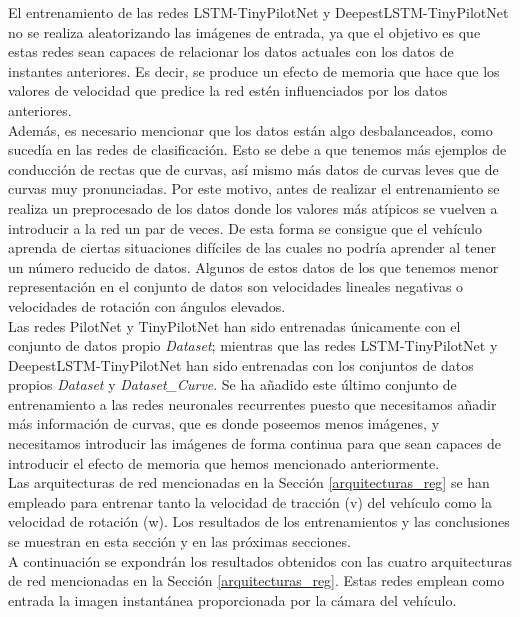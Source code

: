 El entrenamiento de las redes LSTM-TinyPilotNet y DeepestLSTM-TinyPilotNet no se realiza aleatorizando las imágenes de entrada, ya que el objetivo es que estas redes sean capaces de relacionar los datos actuales con los datos de instantes anteriores. Es decir, se produce un efecto de memoria que hace que los valores de velocidad que predice la red estén influenciados por los datos anteriores.\\

Además, es necesario mencionar que los datos están algo desbalanceados, como sucedía en las redes de clasificación. Esto se debe a que tenemos más ejemplos de conducción de rectas que de curvas, así mismo más datos de curvas leves que de curvas muy pronunciadas. Por este motivo, antes de realizar el entrenamiento se realiza un preprocesado de los datos donde los valores más atípicos se vuelven a introducir a la red un par de veces. De esta forma se consigue que el vehículo aprenda de ciertas situaciones difíciles de las cuales no podría aprender al tener un número reducido de datos. Algunos de estos datos de los que tenemos menor representación en el conjunto de datos son velocidades lineales negativas o velocidades de rotación con ángulos elevados.\\

Las redes PilotNet y TinyPilotNet han sido entrenadas únicamente con el conjunto de datos propio \textit{Dataset}; mientras que las redes LSTM-TinyPilotNet y DeepestLSTM-TinyPilotNet han sido entrenadas con los conjuntos de datos propios \textit{Dataset} y \textit{Dataset\_Curve}. Se ha añadido este último conjunto de entrenamiento a las redes neuronales recurrentes puesto que necesitamos añadir más información de curvas, que es donde poseemos menos imágenes, y necesitamos introducir las imágenes de forma continua para que sean capaces de introducir el efecto de memoria que hemos mencionado anteriormente.\\

Las arquitecturas de red mencionadas en la Sección \ref{arquitecturas_reg} se han empleado para entrenar tanto la velocidad de tracción (v) del vehículo como la velocidad de rotación (w). Los resultados de los entrenamientos y las conclusiones se muestran en esta sección y en las próximas secciones.\\

A continuación se expondrán los resultados obtenidos con las cuatro arquitecturas de red mencionadas en la Sección \ref{arquitecturas_reg}. Estas redes emplean como entrada la imagen instantánea proporcionada por la cámara del vehículo.\\

